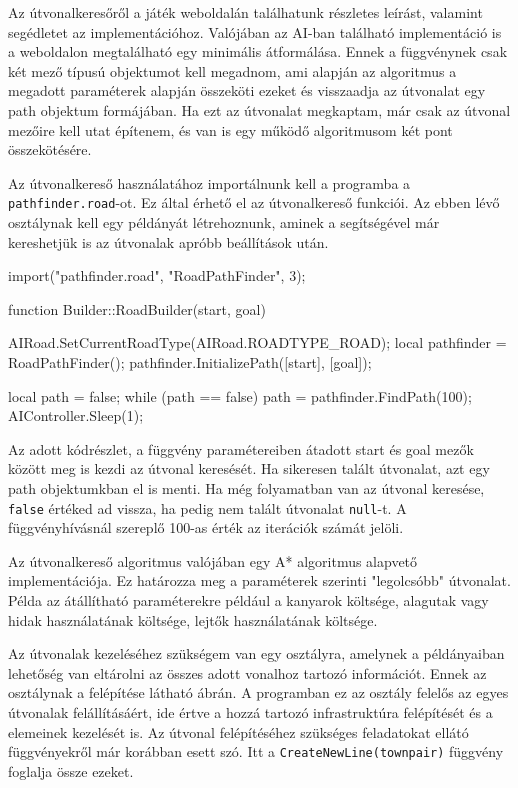 Az útvonalkeresőről a játék weboldalán találhatunk részletes leírást, valamint segédletet az implementációhoz. Valójában az AI-ban található implementáció is a weboldalon megtalálható egy minimális átformálása. Ennek a függvénynek csak két mező típusú objektumot kell megadnom, ami alapján az algoritmus a megadott paraméterek alapján összeköti ezeket és visszaadja az útvonalat egy path objektum formájában. Ha ezt az útvonalat megkaptam, már csak az útvonal mezőire kell utat építenem, és van is egy működő algoritmusom két pont összekötésére.

Az útvonalkereső használatához importálnunk kell a programba a \\ \texttt{pathfinder.road}-ot. Ez által érhető el az útvonalkereső funkciói. Az ebben lévő osztálynak kell egy példányát létrehoznunk, aminek a segítségével már kereshetjük is az útvonalak apróbb beállítások után.

\begin{cpp}
import("pathfinder.road", "RoadPathFinder", 3);

function Builder::RoadBuilder(start, goal) {
  AIRoad.SetCurrentRoadType(AIRoad.ROADTYPE_ROAD);
  local pathfinder = RoadPathFinder();
  pathfinder.InitializePath([start], [goal]);
  
  local path = false;
  while (path == false) {
    path = pathfinder.FindPath(100);
    AIController.Sleep(1);
  }
}
\end{cpp}

Az adott kódrészlet, a függvény paramétereiben átadott start és goal mezők között meg is kezdi az útvonal keresését. Ha sikeresen talált útvonalat, azt egy path objektumkban el is menti. Ha még folyamatban van az útvonal keresése, \texttt{false} értéked ad vissza, ha pedig nem talált útvonalat \texttt{null}-t. A függvényhívásnál szereplő 100-as érték az iterációk számát jelöli.

Az útvonalkereső algoritmus valójában egy A* algoritmus alapvető implementációja. Ez határozza meg a paraméterek szerinti "legolcsóbb" útvonalat. Példa az átállítható paraméterekre például a kanyarok költsége, alagutak vagy hidak használatának költsége, lejtők használatának költsége.


Az útvonalak kezeléséhez szükségem van egy osztályra, amelynek a példányaiban lehetőség van eltárolni az összes adott vonalhoz tartozó információt. Ennek az osztálynak a felépítése látható  ábrán. A programban ez az osztály felelős az egyes útvonalak felállításáért, ide értve a hozzá tartozó infrastruktúra felépítését és a elemeinek kezelését is. Az útvonal felépítéséhez szükséges feladatokat ellátó függvényekről már korábban esett szó. Itt a \texttt{CreateNewLine(townpair)} függvény foglalja össze ezeket.

